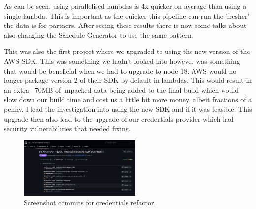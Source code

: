   As can be seen, using parallelised lambdas is 4x quicker on average than using a single lambda. This is important as the quicker this pipeline can run
  the 'fresher' the data is for partners. After seeing these results there is now some talks about also changing the Schedule Generator to use the same 
  pattern.

  \vspace{0.2cm}

  This was also the first project where we upgraded to using the new version of the AWS SDK. This was something we hadn't looked into however was something
  that would be beneficial when we had to upgrade to node 18. AWS would no longer package version 2 of their SDK by default in lambdas. This would result in
  an extra ~70MB of unpacked data being added to the final build which would slow down our build time and cost us a little bit more money, albeit fractions of
  a penny. I lead the investigation into using the new SDK and if it was feasible. This upgrade then also lead to the upgrade of our credentials provider
  which had security vulnerabilities that needed fixing.

  \begin{figure}[H]
    \centering
    \includegraphics[width=6cm]{assets/credentialsRefactorCommits.png}
    \caption{Screenshot commits for credentials refactor.}
    \label{fig:credentialsRefactor}
  \end{figure}

  \newpage
